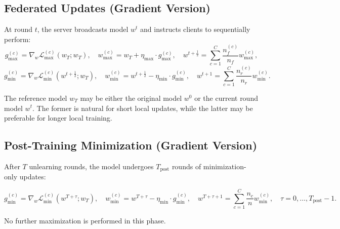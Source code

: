 \documentclass{article}
\begin{document}
\subsection{Federated Updates (Gradient Version)}
At round $t$, the server broadcasts model $w^t$ and instructs clients to sequentially perform:
\[
g_{\mathrm{max}}^{(c)} = \nabla_w \mathcal{L}_{\mathrm{max}}^{(c)}(w_T; w_T), \quad
w_{\mathrm{max}}^{(c)} = w_T + \eta_{\mathrm{max}} \cdot g_{\mathrm{max}}^{(c)}, \quad
w^{t+\frac{1}{2}} = \sum_{c=1}^C \frac{n_f^{(c)}}{n_f} w_{\mathrm{max}}^{(c)},
\]
\[
g_{\mathrm{min}}^{(c)} = \nabla_w \mathcal{L}_{\mathrm{min}}^{(c)}(w^{t+\frac{1}{2}}; w_T), \quad
w_{\mathrm{min}}^{(c)} = w^{t+\frac{1}{2}} - \eta_{\mathrm{min}} \cdot g_{\mathrm{min}}^{(c)}, \quad
w^{t+1} = \sum_{c=1}^C \frac{n_r^{(c)}}{n_r} w_{\mathrm{min}}^{(c)}.
\]

The reference model $w_T$ may be either the original model $w^0$ or the current round model $w^t$. The former is natural for short local updates, while the latter may be preferable for longer local training.

\subsection{Post-Training Minimization (Gradient Version)}

After $T$ unlearning rounds, the model undergoes $T_{\text{post}}$ rounds of minimization-only updates:

\[
g_{\mathrm{min}}^{(c)} = \nabla_w \mathcal{L}_{\mathrm{min}}^{(c)}(w^{T+\tau}; w_T), \quad
w_{\mathrm{min}}^{(c)} = w^{T+\tau} - \eta_{\mathrm{min}} \cdot g_{\mathrm{min}}^{(c)}, \quad
w^{T+\tau+1} = \sum_{c=1}^C \frac{n_c}{n} w_{\mathrm{min}}^{(c)}, \quad \tau = 0, \dots, T_{\text{post}} - 1.
\]

No further maximization is performed in this phase.
\end{document}
